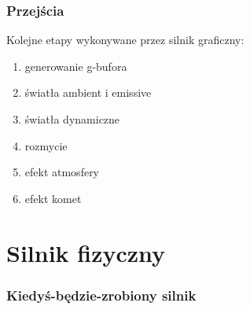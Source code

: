 \documentclass{beamer}
\begin{document}
\frame
{
	\frametitle{Przejścia}

	Kolejne etapy wykonywane przez silnik graficzny:

	\begin{enumerate}
	\item generowanie g-bufora
	\item światła ambient i emissive
	\item światła dynamiczne
	\item rozmycie 
	\item efekt atmosfery
	\item efekt komet
	\end{enumerate}
}

\section{Silnik fizyczny}\label{sec:silnik fizyczny}

\frame
{
	\frametitle{Kiedyś-będzie-zrobiony silnik}
}



\end{document}
